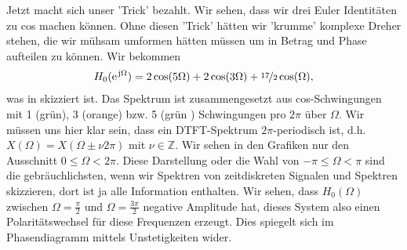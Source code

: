 %
Jetzt macht sich unser 'Trick' bezahlt. Wir sehen, dass wir drei Euler Identitäten
zu cos machen können. Ohne diesen 'Trick' hätten wir 'krumme' komplexe Dreher
stehen, die wir mühsam umformen hätten müssen um in Betrag und Phase aufteilen zu können.
Wir bekommen
\begin{align}
\label{eq:64BE42BAEF_H0}
H_0(\e^{\im\Omega}) = 2 \cos(5\Omega) + 2 \cos(3\Omega) + \nicefrac{17}{2} \cos(\Omega),
\end{align}
was in  skizziert ist.
%
Das Spektrum ist zusammengesetzt aus cos-Schwingungen mit 1 (grün), 3 (orange)
bzw. 5 (grün ) Schwingungen pro $2\pi$ über $\Omega$.
%
Wir müssen uns hier klar sein, dass ein DTFT-Spektrum $2\pi$-periodisch ist, d.h.
$X(\Omega) = X(\Omega \pm \nu 2\pi)$ mit $\nu\in\mathbb{Z}$. Wir sehen in den
Grafiken nur den
Ausschnitt $0\leq \Omega < 2\pi$. Diese Darstellung oder die Wahl von
$-\pi\leq \Omega < \pi$ sind die gebräuchlichsten, wenn wir
Spektren von zeitdiskreten Signalen und Spektren skizzieren, dort ist ja
alle Information enthalten.
%
Wir sehen, dass $H_0(\Omega)$ zwischen $\Omega=\frac{\pi}{2}$ und $\Omega=\frac{3\pi}{2}$
negative Amplitude hat, dieses System also einen Polaritätswechsel für diese
Frequenzen erzeugt.
Dies spiegelt sich im Phasendiagramm mittels Unstetigkeiten wider.

